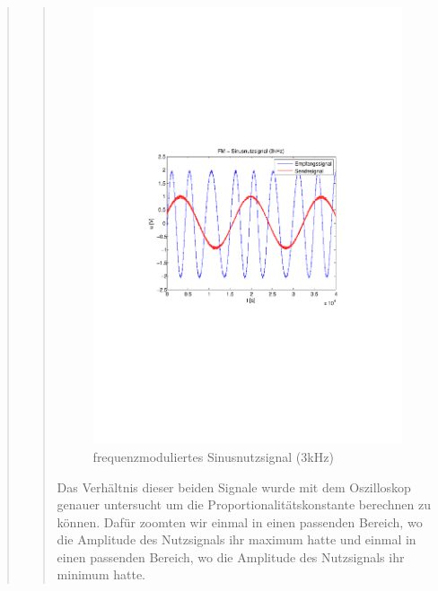 \begin{quote}
\begin{quote}
\begin{figure}[H]
                    \includegraphics[scale=0.5, trim = 3cm 8.5cm 3.5cm 8.5cm,
                    clip]{./Bilder/fm_sinus(3kHz)}
                        \caption{frequenzmoduliertes Sinusnutzsignal (3kHz)}
                \end{figure}
        
        Das Verhältnis dieser beiden Signale wurde mit dem Oszilloskop genauer
        untersucht um die Proportionalitätskonstante berechnen zu können. Dafür
        zoomten wir einmal in einen passenden Bereich, wo die Amplitude des
        Nutzsignals ihr maximum hatte und einmal in einen passenden Bereich, wo die
        Amplitude des Nutzsignals ihr minimum hatte.
        

\end{quote}
\end{quote}
